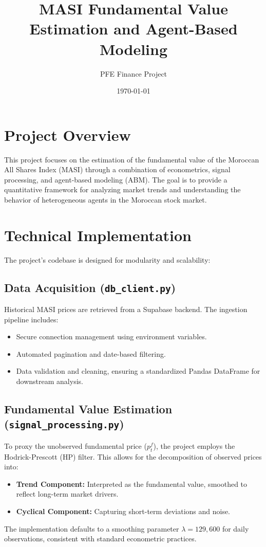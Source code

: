 \documentclass{article}
\title{MASI Fundamental Value Estimation and Agent-Based Modeling}
\author{PFE Finance Project}
\date{\today}
\begin{document}
\maketitle

\section{Project Overview}
This project focuses on the estimation of the fundamental value of the Moroccan All Shares Index (MASI) through a combination of econometrics, signal processing, and agent-based modeling (ABM). The goal is to provide a quantitative framework for analyzing market trends and understanding the behavior of heterogeneous agents in the Moroccan stock market.

\section{Technical Implementation}
The project's codebase is designed for modularity and scalability:

\subsection{Data Acquisition (\texttt{db\_client.py})}
Historical MASI prices are retrieved from a Supabase backend. The ingestion pipeline includes:
\begin{itemize}
    \item Secure connection management using environment variables.
    \item Automated pagination and date-based filtering.
    \item Data validation and cleaning, ensuring a standardized Pandas DataFrame for downstream analysis.
\end{itemize}

\subsection{Fundamental Value Estimation (\texttt{signal\_processing.py})}
To proxy the unobserved fundamental price ($p_t^f$), the project employs the Hodrick-Prescott (HP) filter. This allows for the decomposition of observed prices into:
\begin{itemize}
    \item \textbf{Trend Component:} Interpreted as the fundamental value, smoothed to reflect long-term market drivers.
    \item \textbf{Cyclical Component:} Capturing short-term deviations and noise.
\end{itemize}
The implementation defaults to a smoothing parameter $\lambda = 129,600$ for daily observations, consistent with standard econometric practices.
\end{document}
